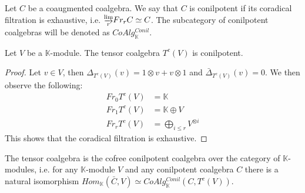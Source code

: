 \documentclass[../thesis.tex]{subfiles}
\begin{document}
            \begin{definition}
                Let $C$ be a coaugmented coalgebra. We say that $C$ is conilpotent if its coradical filtration is exhaustive, i.e. $\substack{\varinjlim \\ r}Fr_rC \simeq C$. The subcategory of conilpotent coalgebras will be denoted as $CoAlg^{Conil}_{\mathbb{K}}$.
            \end{definition}
            
            \begin{proposition}
                Let $V$ be a $\mathbb{K}$-module. The tensor coalgebra $T^c(V)$ is conilpotent.
            \end{proposition}

            \begin{proof}
                Let $v\in V$, then $\Delta_{T^c(V)}(v)=1\otimes v + v\otimes 1$ and $\bar{\Delta}_{T^c(V)}(v)=0$. We then observe the following:
                \begin{align*}
                    Fr_0T^c(V) & = \mathbb{K} \\
                    Fr_1T^c(V) & = \mathbb{K} \oplus V \\
                    Fr_rT^c(V) & = \bigoplus_{i\leq r} V^{\otimes i}
                \end{align*}
                This shows that the coradical filtration is exhaustive.
            \end{proof}

            \begin{proposition}
                The tensor coalgebra is the cofree conilpotent coalgebra over the category of $\mathbb{K}$-modules, i.e. for any $\mathbb{K}$-module $V$ and any conilpotent coalgebra $C$ there is a natural isomorphism $Hom_{\mathbb{K}}(\bar{C}, V)\simeq CoAlg^{Conil}_{\mathbb{K}}(C, T^c(V))$.
            \end{proposition}
\end{document}
